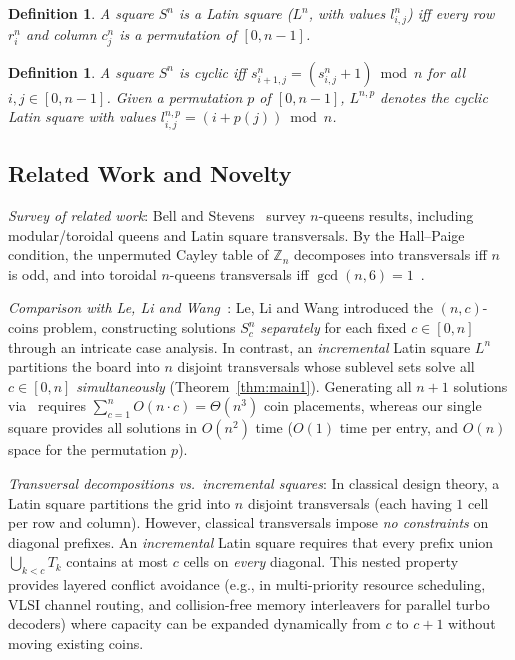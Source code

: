 \documentclass[10pt,a4paper]{article}
\newtheorem{definition}[theorem]{Definition}
\theoremstyle{remark}
\begin{document}
\begin{definition}\label{def:ls}
A square $S^n$ is a \emph{Latin} square ($L^n$, with values $l^n_{i,j}$) iff every row $r^n_i$ and
column $c^n_j$ is a permutation of $[0,n-1]$.
\end{definition}

\begin{definition}\label{def:cs}
A square $S^n$ is \emph{cyclic} iff $s^n_{i + 1, j} = (s^n_{i,j} + 1) \bmod n$ for all
$i,j \in [0,n-1]$. Given a permutation $p$ of $[0,n-1]$, $L^{n,p}$ denotes the cyclic Latin square
with values $l^{n,p}_{i,j} = (i + p(j)) \bmod n$.
\end{definition}

\subsection{Related Work and Novelty}\label{sec:related}

\emph{Survey of related work}: Bell and Stevens~\cite{BS2009} survey $n$-queens results, including
modular/toroidal queens and Latin square transversals. By the Hall--Paige condition, the unpermuted
Cayley table of $\mathbb{Z}_n$ decomposes into transversals iff $n$ is odd, and into toroidal $n$-queens
transversals iff $\gcd(n,6) = 1$~\cite{BS2009,CW2010}.

\emph{Comparison with Le, Li and Wang~\cite{LLW1990}}: Le, Li and Wang introduced the $(n,c)$-coins
problem, constructing solutions $S^n_c$ \emph{separately} for each fixed $c \in [0,n]$ through an
intricate case analysis. In contrast, an \emph{incremental} Latin square $L^n$ partitions the board
into $n$ disjoint transversals whose sublevel sets solve all $c \in [0,n]$ \emph{simultaneously}
(Theorem~\ref{thm:main1}). Generating all $n + 1$ solutions via~\cite{LLW1990} requires
$\sum_{c=1}^n O(n \cdot c) = \Theta(n^3)$ coin placements, whereas our single square provides all
solutions in $O(n^2)$ time ($O(1)$ time per entry, and $O(n)$ space for the permutation $p$).

\emph{Transversal decompositions vs.\ incremental squares}: In classical design theory, a Latin square
partitions the grid into $n$ disjoint transversals (each having $1$ cell per row and column). However,
classical transversals impose \emph{no constraints} on diagonal prefixes. An \emph{incremental} Latin
square requires that every prefix union $\bigcup_{k < c} T_k$ contains at most $c$ cells on \emph{every}
diagonal. This nested property provides layered conflict avoidance (e.g., in multi-priority resource
scheduling, VLSI channel routing, and collision-free memory interleavers for parallel turbo decoders)
where capacity can be expanded dynamically from $c$ to $c+1$ without moving existing coins.
\end{document}
